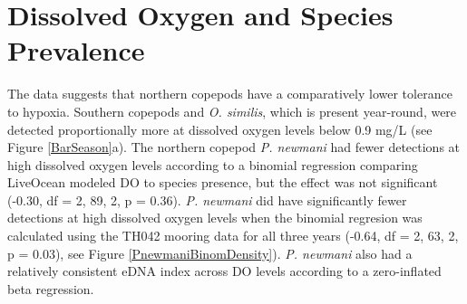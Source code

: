 \documentclass[12pt,twoside]{reedthesis}
\begin{document}
	\section{Dissolved Oxygen and Species Prevalence} 
	
	The data suggests that northern copepods have a comparatively lower tolerance to hypoxia. Southern copepods and \textit{O. similis}, which is present year-round, were detected proportionally more at dissolved oxygen levels below 0.9 mg/L (see Figure \ref{BarSeason}a). 
	The northern copepod \textit{P. newmani} had fewer detections at high dissolved oxygen levels according to a binomial regression comparing LiveOcean modeled DO to species presence, but the effect was not significant (-0.30, df = 2, 89, 2, p = 0.36). \textit{P. newmani} did have significantly fewer detections at high dissolved oxygen levels when the binomial regresion was calculated using the TH042 mooring data for all three years (-0.64, df = 2, 63, 2, p = 0.03), see Figure \ref{PnewmaniBinomDensity}). 
	\textit{P. newmani} also had a relatively consistent eDNA index across DO levels according to a zero-inflated beta regression. 
	
\end{document}
